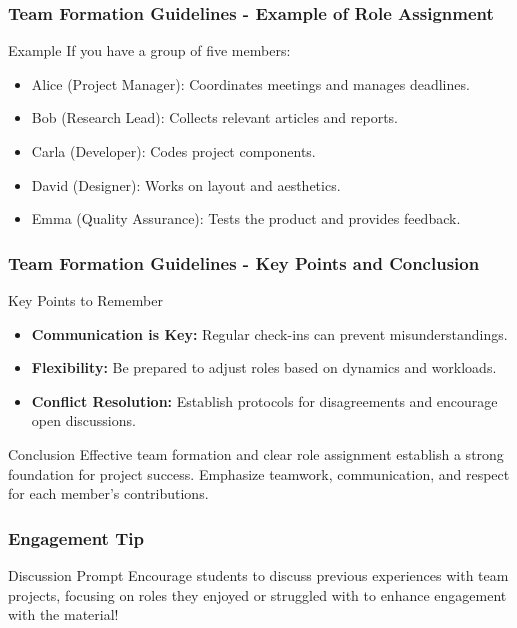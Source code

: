 \documentclass[aspectratio=169]{beamer}
\begin{document}
\begin{frame}[fragile]
    \frametitle{Team Formation Guidelines - Example of Role Assignment}
    \begin{block}{Example}
        If you have a group of five members:
        \begin{itemize}
            \item Alice (Project Manager): Coordinates meetings and manages deadlines.
            \item Bob (Research Lead): Collects relevant articles and reports.
            \item Carla (Developer): Codes project components.
            \item David (Designer): Works on layout and aesthetics.
            \item Emma (Quality Assurance): Tests the product and provides feedback.
        \end{itemize}
    \end{block}
\end{frame}

\begin{frame}[fragile]
    \frametitle{Team Formation Guidelines - Key Points and Conclusion}
    \begin{block}{Key Points to Remember}
        \begin{itemize}
            \item \textbf{Communication is Key:} Regular check-ins can prevent misunderstandings.
            \item \textbf{Flexibility:} Be prepared to adjust roles based on dynamics and workloads.
            \item \textbf{Conflict Resolution:} Establish protocols for disagreements and encourage open discussions.
        \end{itemize}
    \end{block}
    \begin{block}{Conclusion}
        Effective team formation and clear role assignment establish a strong foundation for project success. 
        Emphasize teamwork, communication, and respect for each member's contributions.
    \end{block}
\end{frame}

\begin{frame}[fragile]
    \frametitle{Engagement Tip}
    \begin{block}{Discussion Prompt}
        Encourage students to discuss previous experiences with team projects, 
        focusing on roles they enjoyed or struggled with to enhance engagement with the material!
    \end{block}
\end{frame}
\end{document}
